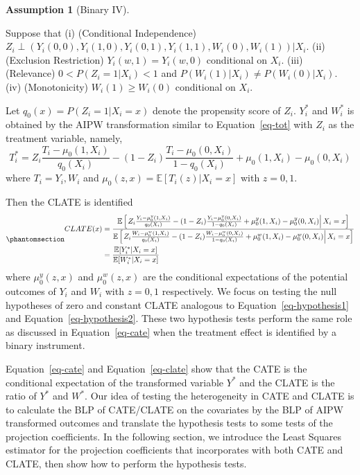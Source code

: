 \documentclass[
  12pt,
  12pt]{article}
\numberwithin{equation}{section}
\theoremstyle{definition}
\newtheorem{exercise}{Assumption}[section]
\theoremstyle{plain}
\theoremstyle{plain}
\theoremstyle{remark}
\begin{document}
\begin{exercise}[Binary IV]\protect\hypertarget{exr-iv}{}\label{exr-iv}

Suppose that (i) (Conditional Independence)
\hfill \break \(Z_i \perp (Y_i(0, 0), Y_i(1, 0), Y_i(0, 1), Y_i(1, 1), W_i(0), W_i(1)) \vert X_i\).
(ii) (Exclusion Restriction) \(Y_i(w, 1) = Y_i(w, 0)\) conditional on
\(X_i\). (iii) (Relevance) \(0 < P(Z_i = 1|X_i) < 1\) and
\(P(W_i(1)|X_i) \neq P(W_i(0)|X_i)\). (iv) (Monotonicity)
\(W_i(1) \geqslant W_i(0)\) conditional on \(X_i\).

\end{exercise}

Let \(q_0(x) = P(Z_i = 1 \vert X_i = x)\) denote the propensity score of
\(Z_i\). \(Y^*_i\) and \(W^*_i\) is obtained by the AIPW transformation
similar to Equation~\ref{eq-tot} with \(Z_i\) as the treatment variable,
namely, \[
T^*_i = Z_i\frac{T_i - \mu_0(1, X_i)}{q_0(X_i)} - (1 - Z_i)\frac{T_i - \mu_0(0, X_i)}{1 - q_0(X_i)} + \mu_0(1, X_i) - \mu_0(0, X_i)
\] where \(T_i = Y_i, W_i\) and
\(\mu_0(z, x) = \mathbb{E}[T_i(z)|X_i = x]\) with \(z = 0, 1\).

Then the CLATE is identified
\begin{equation}\phantomsection\label{eq-clate}{
\begin{aligned}
CLATE(x) &= \frac{\mathbb{E}\left[\left. Z_i\frac{Y_i - \mu_0^y(1, X_i)}{q_0(X_i)} - (1 - Z_i)\frac{Y_i - \mu_0^y(0, X_i)}{1 - q_0(X_i)} + \mu_0^y(1, X_i) - \mu_0^y(0, X_i)\right\vert X_i = x\right]}{\mathbb{E}\left[\left. Z_i\frac{W_i - \mu_0^w(1, X_i)}{q_0(X_i)} - (1 - Z_i)\frac{W_i - \mu_0^w(0, X_i)}{1 - q_0(X_i)} + \mu_0^w(1, X_i) - \mu_0^w(0, X_i)\right\vert X_i = x \right]} \\
&= \frac{\mathbb{E}[Y_i^* \vert X_i = x]}{\mathbb{E}[W_i^* \vert X_i = x]}
\end{aligned}
}\end{equation} where \(\mu_0^y(z, x)\) and \(\mu_0^w(z, x)\) are the
conditional expectations of the potential outcomes of \(Y_i\) and
\(W_i\) with \(z = 0, 1\) respectively. We focus on testing the null
hypotheses of zero and constant CLATE analogous to
Equation~\ref{eq-hypothesis1} and Equation~\ref{eq-hypothesis2}. These
two hypothesis tests perform the same role as discussed in
Equation~\ref{eq-cate} when the treatment effect is identified by a
binary instrument.

Equation~\ref{eq-cate} and Equation~\ref{eq-clate} show that the CATE is
the conditional expectation of the transformed variable \(Y^*\) and the
CLATE is the ratio of \(Y^*\) and \(W^*\). Our idea of testing the
heterogeneity in CATE and CLATE is to calculate the BLP of CATE/CLATE on
the covariates by the BLP of AIPW transformed outcomes and translate the
hypothesis tests to some tests of the projection coefficients. In the
following section, we introduce the Least Squares estimator for the
projection coefficients that incorporates with both CATE and CLATE, then
show how to perform the hypothesis tests.
\end{document}
